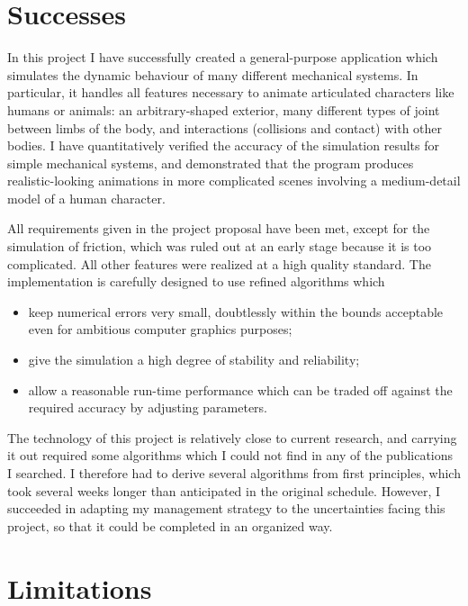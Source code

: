 \section{Successes}

In this project I have successfully created a general-purpose application which simulates
the dynamic behaviour of many different mechanical systems. In particular, it handles all
features necessary to animate articulated characters like humans or animals: an
arbitrary-shaped exterior, many different types of joint between limbs of the body, and
interactions (collisions and contact) with other bodies. I have quantitatively verified
the accuracy of the simulation results for simple mechanical systems, and demonstrated that
the program produces realistic-looking animations in more complicated scenes involving a
medium-detail model of a human character.

All requirements given in the project proposal have been met, except for the simulation of friction,
which was ruled out at an early stage because it is too complicated. All other features were
realized at a high quality standard. The implementation is carefully designed to use refined
algorithms which 
\begin{itemize}
\item keep numerical errors very small, doubtlessly within the bounds acceptable even for
    ambitious computer graphics purposes;
\item give the simulation a high degree of stability and reliability;
\item allow a reasonable run-time performance which can be traded off against the required
    accuracy by adjusting parameters.
\end{itemize}

The technology of this project is relatively close to current research, and carrying it out
required some algorithms which I could not find in any of the publications I searched. I therefore
had to derive several algorithms from first principles, which took several weeks longer than
anticipated in the original schedule. However, I succeeded in adapting my management strategy
to the uncertainties facing this project, so that it could be completed in an organized way.

\section{Limitations}

